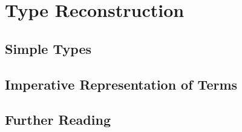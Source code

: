 \chapter{Type Reconstruction}

\section{Simple Types}

\section{Imperative Representation of Terms}

\section{Further Reading}
